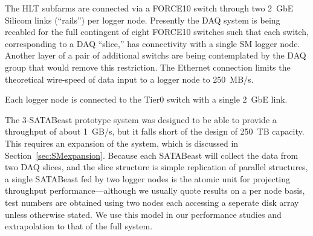 The HLT subfarms are connected via a FORCE10 switch through
two 2~GbE Silicom links (``rails'') per logger node.
Presently the DAQ system is being recabled for the full contingent of eight FORCE10 switches
such that each switch, corresponding to a DAQ ``slice,'' has connectivity with 
a single SM logger node.
Another layer of a pair of additional switchs are being contemplated by the DAQ group
that would remove this restriction.
The Ethernet connection limits the theoretical wire-speed of data input
to a logger node to 250~MB/s.

Each logger node is connected to the Tier0 switch with a single 2~GbE link.  

The 3-SATABeast prototype system was designed to be able to provide a throughput of about 1~GB/s,
but it falls short of the design of 250~TB capacity. 
This requires an expansion of the system, which is discussed in Section~\ref{sec:SMexpansion}.
Because each SATABeast will collect the data from two DAQ slices, and the slice structure
is simple replication of parallel structures, a single SATABeast fed by two logger nodes
is the atomic unit for projecting throughput performance---although we usually quote
results on a per node basis, test numbers are
obtained using two nodes each accessing a seperate disk array unless otherwise stated.
We use this model in our performance studies and extrapolation to that of the full system.

